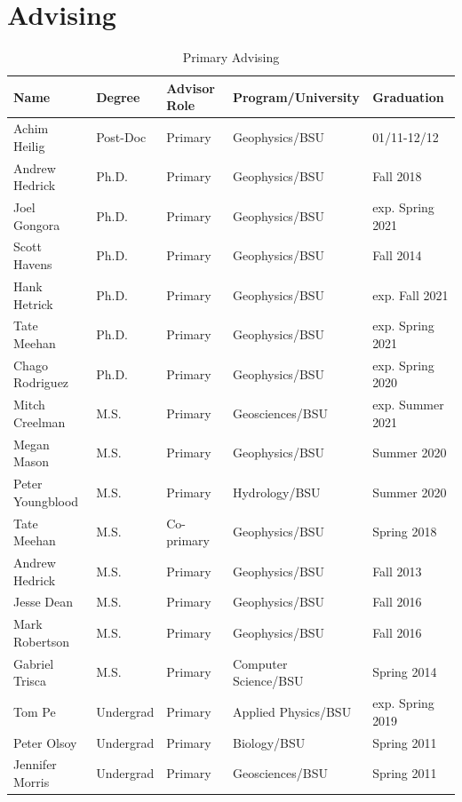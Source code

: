 \documentclass[11pt]{article}
\renewcommand\arraystretch{1}
\begin{document}
\section*{Advising}
\begin{table}[!htbp]
\caption*{Primary Advising}
\renewcommand\arraystretch{0.7}
  \centering
  \begin{tabular}{|l|l|l|l|l|}
\hline
\textbf{Name} & \textbf{Degree} & \textbf{Advisor Role} & \textbf{Program/University} & \textbf{Graduation} \\ \hline \hline
Achim Heilig & Post-Doc & Primary & Geophysics/BSU & 01/11-12/12 \\ \hline
Andrew Hedrick & Ph.D. & Primary & Geophysics/BSU & Fall 2018 \\ \hline
Joel Gongora & Ph.D. & Primary & Geophysics/BSU & exp. Spring 2021 \\ \hline
Scott Havens & Ph.D. & Primary & Geophysics/BSU & Fall 2014 \\ \hline
Hank Hetrick & Ph.D. & Primary & Geophysics/BSU & exp. Fall 2021 \\ \hline
Tate Meehan & Ph.D. & Primary & Geophysics/BSU & exp. Spring 2021 \\ \hline
Chago Rodriguez & Ph.D. & Primary & Geophysics/BSU & exp. Spring 2020 \\ \hline
Mitch Creelman & M.S. & Primary & Geosciences/BSU & exp. Summer 2021 \\ \hline
Megan Mason & M.S. & Primary & Geophysics/BSU & Summer 2020 \\ \hline
Peter Youngblood & M.S. & Primary & Hydrology/BSU & Summer 2020 \\ \hline
Tate Meehan & M.S. & Co-primary & Geophysics/BSU & Spring 2018 \\ \hline
Andrew Hedrick & M.S. & Primary & Geophysics/BSU & Fall 2013 \\ \hline
Jesse Dean & M.S. & Primary & Geophysics/BSU & Fall 2016 \\ \hline
Mark Robertson & M.S. & Primary & Geophysics/BSU & Fall 2016 \\ \hline
Gabriel Trisca & M.S. & Primary & Computer Science/BSU & Spring 2014 \\ \hline
Tom Pe & Undergrad & Primary & Applied Physics/BSU & exp. Spring 2019 \\ \hline
Peter Olsoy & Undergrad & Primary & Biology/BSU & Spring 2011 \\ \hline
Jennifer Morris & Undergrad & Primary & Geosciences/BSU & Spring 2011 \\ \hline

\end{tabular}
\end{table}
\end{document}
